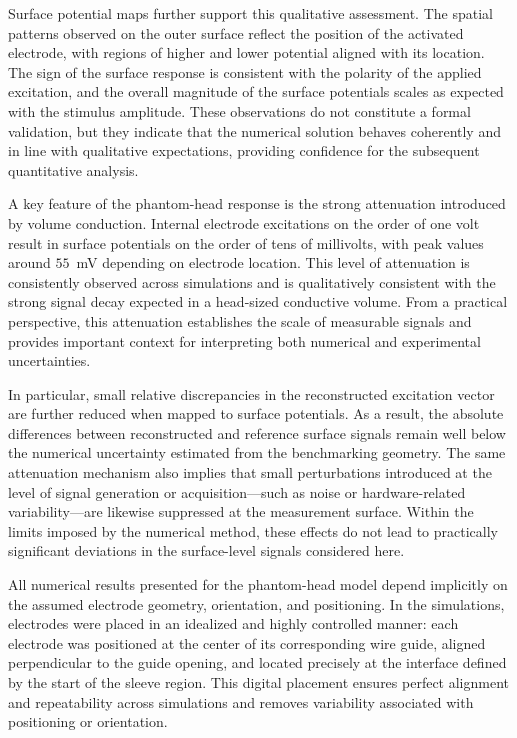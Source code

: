 \documentclass[../00_Main.tex]{subfiles}
\begin{document}
Surface potential maps further support this qualitative assessment. The spatial patterns observed on the outer surface reflect the position of the activated electrode, with regions of higher and lower potential aligned with its location. The sign of the surface response is consistent with the polarity of the applied excitation, and the overall magnitude of the surface potentials scales as expected with the stimulus amplitude. These observations do not constitute a formal validation, but they indicate that the numerical solution behaves coherently and in line with qualitative expectations, providing confidence for the subsequent quantitative analysis.

A key feature of the phantom-head response is the strong attenuation introduced by volume conduction. Internal electrode excitations on the order of one volt result in surface potentials on the order of tens of millivolts, with peak values around $55$~mV depending on electrode location. This level of attenuation is consistently observed across simulations and is qualitatively consistent with the strong signal decay expected in a head-sized conductive volume. From a practical perspective, this attenuation establishes the scale of measurable signals and provides important context for interpreting both numerical and experimental uncertainties.

In particular, small relative discrepancies in the reconstructed excitation vector are further reduced when mapped to surface potentials. As a result, the absolute differences between reconstructed and reference surface signals remain well below the numerical uncertainty estimated from the benchmarking geometry. The same attenuation mechanism also implies that small perturbations introduced at the level of signal generation or acquisition—such as noise or hardware-related variability—are likewise suppressed at the measurement surface. Within the limits imposed by the numerical method, these effects do not lead to practically significant deviations in the surface-level signals considered here.

All numerical results presented for the phantom-head model depend implicitly on the assumed electrode geometry, orientation, and positioning. In the simulations, electrodes were placed in an idealized and highly controlled manner: each electrode was positioned at the center of its corresponding wire guide, aligned perpendicular to the guide opening, and located precisely at the interface defined by the start of the sleeve region. This digital placement ensures perfect alignment and repeatability across simulations and removes variability associated with positioning or orientation.
\end{document}
